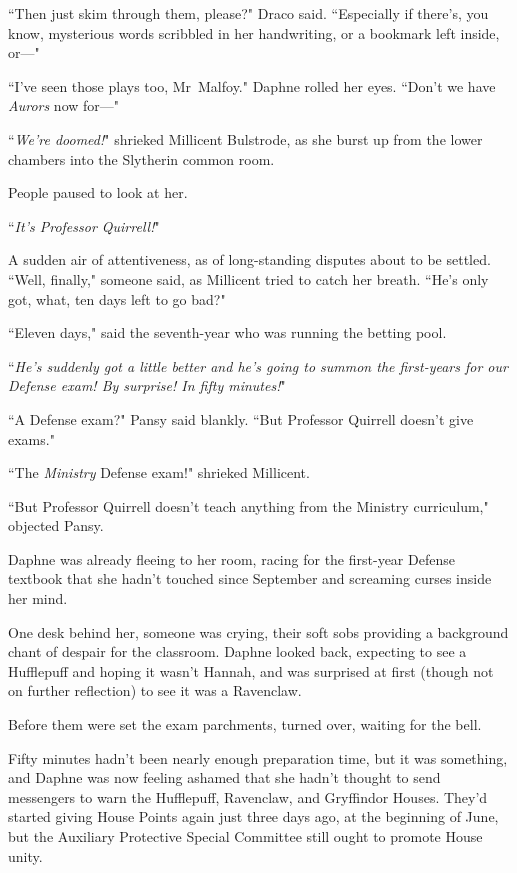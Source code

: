 ``Then just skim through them, please?" Draco said. ``Especially if there's, you know, mysterious words scribbled in her handwriting, or a bookmark left inside, or—"

``I've seen those plays too, Mr~Malfoy." Daphne rolled her eyes. ``Don't we have \emph{Aurors} now for—"

``\emph{We're doomed!}" shrieked Millicent Bulstrode, as she burst up from the lower chambers into the Slytherin common room.

People paused to look at her.

``\emph{It's Professor Quirrell!}"

A sudden air of attentiveness, as of long-standing disputes about to be settled. ``Well, finally," someone said, as Millicent tried to catch her breath. ``He's only got, what, ten days left to go bad?"

``Eleven days," said the seventh-year who was running the betting pool.

``\emph{He's suddenly got a little better and he's going to summon the first-years for our Defense exam! By surprise! In fifty minutes!}"

``A Defense exam?" Pansy said blankly. ``But Professor Quirrell doesn't give exams."

``The \emph{Ministry} Defense exam!" shrieked Millicent.

``But Professor Quirrell doesn't teach anything from the Ministry curriculum," objected Pansy.

Daphne was already fleeing to her room, racing for the first-year Defense textbook that she hadn't touched since September and screaming curses inside her mind.

\later

One desk behind her, someone was crying, their soft sobs providing a background chant of despair for the classroom. Daphne looked back, expecting to see a Hufflepuff and hoping it wasn't Hannah, and was surprised at first (though not on further reflection) to see it was a Ravenclaw.

Before them were set the exam parchments, turned over, waiting for the bell.

Fifty minutes hadn't been nearly enough preparation time, but it was something, and Daphne was now feeling ashamed that she hadn't thought to send messengers to warn the Hufflepuff, Ravenclaw, and Gryffindor Houses. They'd started giving House Points again just three days ago, at the beginning of June, but the Auxiliary Protective Special Committee still ought to promote House unity.

